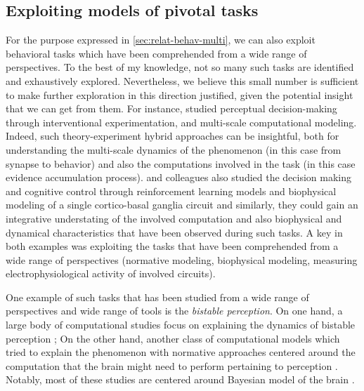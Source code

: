 \subsection{Exploiting models of pivotal tasks}\label{sec:expl-models-pivot}
For the purpose expressed in \autoref{sec:relat-behav-multi}, we can also exploit behavioral tasks which have been comprehended from a wide range of perspectives.
To the best of my knowledge, not so many such tasks are identified and exhaustively explored.
Nevertheless, we believe this small number is sufficient to  make further exploration in this direction justified, given the potential insight that we can get from them.
For instance, \citet{cavanaghCircuitMechanismIrrationalities2019} studied perceptual decision-making through interventional experimentation, and multi-scale computational modeling.
Indeed, such theory-experiment hybrid approaches can be insightful,
both for understanding the multi-scale dynamics of the phenomenon (in this case from synapse to behavior) and also the computations involved in the task (in this case evidence accumulation process).
\citet{frankLinkingLevelsComputation2015} and colleagues also studied the decision making and cognitive control through reinforcement learning models and biophysical modeling of a single cortico-basal ganglia circuit and
similarly, they could gain an integrative understating of the involved computation and also biophysical and dynamical characteristics that have been observed during such tasks.
A key in both examples was exploiting the tasks that have been comprehended from a wide range of perspectives
(normative modeling, biophysical modeling, measuring electrophysiological activity of involved circuits).

One example of such tasks that has been studied from a wide range of perspectives and wide range of tools is the \emph{bistable perception}.
On one hand, a large body of computational studies focus on explaining the dynamics of bistable perception \cite{moreno-boteNoiseinducedAlternationsAttractor2007a,shpiroBalanceNoiseAdaptation2009a,pastukhovMultistablePerceptionBalances2013a,vattikutiCanonicalCorticalCircuit2016,cohenDynamicalModelingMultiscale2019}; 
On the other hand, another class of computational models which
tried to explain the phenomenon with normative approaches centered around the computation that the brain might need to perform pertaining to perception \cite{bialekRandomSwitchingOptimal1995,dayanHierarchicalModelBinocular1998,hohwyPredictiveCodingExplains2008a,atwalStatisticalMechanicsMultistable2014a,samuelgershmanPerceptualMultistabilityMarkov2014a}.
Notably, most of these studies are centered around Bayesian model of the brain \cite{knillBayesianBrainRole2004,doyaBayesianBrainProbabilistic2007}.

